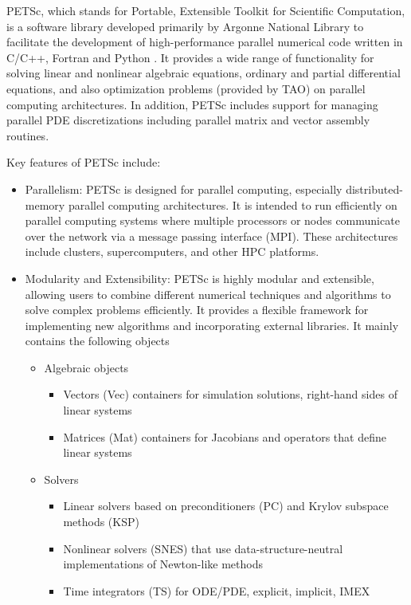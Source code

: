
PETSc, which stands for Portable, Extensible Toolkit for Scientific Computation, is a software library developed primarily by Argonne National Library to facilitate the development of high-performance parallel numerical code written in C/C++, Fortran and Python \citep{petsc-web-page}.
It provides a wide range of functionality for solving linear and nonlinear algebraic equations, ordinary and partial differential equations, and also optimization problems (provided by TAO) on parallel computing architectures.
In addition, PETSc includes support for managing parallel PDE discretizations including parallel matrix and vector assembly routines.

Key features of PETSc include:
\begin{itemize}
    \item Parallelism: PETSc is designed for parallel computing, especially distributed-memory parallel computing architectures. It is intended to run efficiently on parallel computing systems where multiple processors or nodes communicate over the network via a message passing interface (MPI).
    These architectures include clusters, supercomputers, and other HPC platforms.
    \item Modularity and Extensibility: PETSc is highly modular and extensible, allowing users to combine different numerical techniques and algorithms to solve complex problems efficiently.
    It provides a flexible framework for implementing new algorithms and incorporating external libraries. It mainly contains the following objects
    \begin{itemize}
        \item Algebraic objects 
            \begin{itemize}
                \item Vectors (Vec) containers for simulation solutions, right-hand sides of linear systems
                \item Matrices (Mat) containers for Jacobians and operators that define linear systems
            \end{itemize}
        \item Solvers
            \begin{itemize}
                \item Linear solvers based on preconditioners (PC) and Krylov subspace methods (KSP)
                \item Nonlinear solvers (SNES) that use data-structure-neutral implementations of Newton-like methods
                \item Time integrators (TS) for ODE/PDE, explicit, implicit, IMEX

\end{itemize}
\end{itemize}
\end{itemize}
